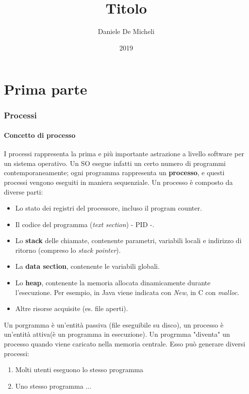 \documentclass[11pt]{article}
\title{Titolo}
\author{Daniele De Micheli}
\date{2019}
\begin{document}
\maketitle
\tableofcontents

\part{Prima parte}

\section{Processi}
\subsection{Concetto di processo}
I processi rappresenta la prima e più importante astrazione a livello software per un sistema operativo. Un SO esegue infatti un certo numero di programmi contemporaneamente; ogni programma rappresenta un \textbf{processo}, e questi processi vengono eseguiti in maniera sequenziale.
Un processo è composto da diverse parti:
\begin{itemize}
	\item Lo stato dei registri del processore, incluso il program counter.
	\item Il codice del programma (\textit{text section}) - PID -.
	\item Lo \textbf{stack} delle chiamate, contenente parametri, variabili locali e indirizzo di ritorno (compreso lo \textit{stack pointer}).
	\item La \textbf{data section}, contenente le variabili globali.
	\item Lo \textbf{heap}, contenente la memoria allocata dinamicamente durante l'esecuzione. Per esempio, in Java viene indicata con \emph{New}, in C con \emph{malloc}.
	\item Altre risorse acquisite (es. file aperti).
\end{itemize}
Un porgramma è un'entità passiva (file eseguibile su disco), un processo è un'entità attiva(è un programma in esecuzione). Un progrmma "diventa" un processo quando viene caricato nella memoria centrale. Esso può generare diversi processi:
\begin{enumerate}
	\item Molti utenti eseguono lo stesso programma
	\item Uno stesso programma ...
\end{enumerate}
\end{document}
